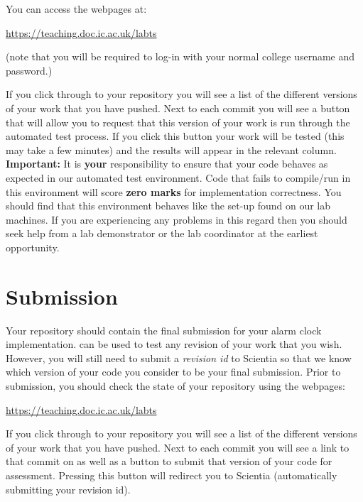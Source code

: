 \documentclass[a4paper,11pt]{article}
\begin{document}
You can access the  webpages at:

\url{https://teaching.doc.ic.ac.uk/labts}

\noindent (note that you will be required to log-in with your normal college username and password.)

If you click through to your  repository you will see a list of the different versions of your work that you have pushed.
Next to each commit you will see a button that will allow you to request that this version of your work is run through the automated test process.
If you click this button your work will be tested (this may take a few minutes) and the results will appear in the relevant column.\\

{\bf Important:} It is {\bf your} responsibility to ensure that your code behaves as expected in our automated test environment. 
Code that fails to compile/run in this environment will score {\bf zero marks} for implementation correctness.
You should find that this environment behaves like the set-up found on our lab machines.
If you are experiencing any problems in this regard then you should seek help from a lab demonstrator or the lab coordinator at the earliest opportunity.


\section*{Submission}
Your  repository should contain the final submission for your alarm clock implementation.
 can be used to test any revision of your work that you wish.
However, you will still need to submit a \emph{revision id} to Scientia so that we know which version of your code you consider to be your final submission. 
Prior to submission, you should check the state of your  repository using the  webpages:

\url{https://teaching.doc.ic.ac.uk/labts}

\noindent If you click through to your  repository you will see a list of the different versions of your work that you have pushed.
Next to each commit you will see a link to that commit on  as well as a button to submit that version of your code for assessment.
Pressing this button will redirect you to Scientia (automatically submitting your revision id).
\end{document}
